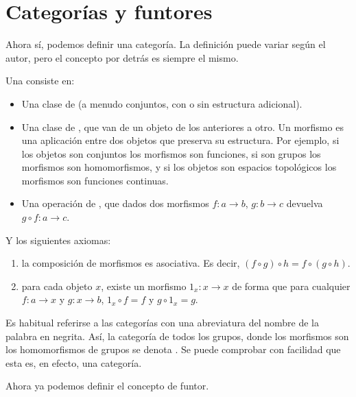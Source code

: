 \section{Categorías y funtores}

Ahora sí, podemos definir una categoría. La definición puede variar según el autor, pero el concepto por detrás es siempre el mismo.

\begin{defi}[Categoría]
\label{funt_defi_categoria}

Una  consiste en:

\begin{itemize}
\item Una clase de  (a menudo conjuntos, con o sin estructura adicional).
\item Una clase de , que van de un objeto de los anteriores a otro. Un morfismo es una aplicación entre dos objetos que preserva su estructura. Por ejemplo, si los objetos son conjuntos los morfismos son funciones, si son grupos los morfismos son homomorfismos, y si los objetos son espacios topológicos los morfismos son funciones continuas.
\item Una operación de , que dados dos morfismos $f:a\to b$, $g:b\to c$ devuelva $g\circ f:a\to c$.
\end{itemize}

Y los siguientes axiomas:
\begin{enumerate}[label=\Roman*]
\item {} la composición de morfismos es asociativa. Es decir, $(f\circ g)\circ h=f\circ(g\circ h)$.
\item {} para cada objeto $x$, existe un morfismo $1_x:x\to x$ de forma que para cualquier $f:a\to x$ y $g:x\to b$, $1_x\circ f=f$ y $g\circ 1_x=g$.
\end{enumerate}
\end{defi}

\begin{obs}[Notación]
	Es habitual referirse a las categorías con una abreviatura del nombre de la palabra en negrita. Así, la categoría de todos los grupos, donde los morfismos son los homomorfismos de grupos se denota \Grp. Se puede comprobar con facilidad que esta es, en efecto, una categoría.
\end{obs}

Ahora ya podemos definir el concepto de funtor.

